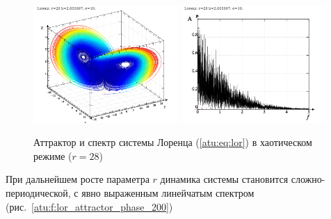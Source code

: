 \begin{figure}[h!]
\begin{center}
  \includegraphics[width=0.49\textwidth]{p/cha/lor/lor0-p_xyz_r=028.png}
  \hfill
  \includegraphics[width=0.49\textwidth]{p/cha/lor/lor0_fft-p_f_r=028.png}
\end{center}
  \caption{Аттрактор и спектр системы Лоренца (\ref{atu:eq:lor}) в хаотическом режиме ($r=28$)}
\label{atu:f:lor_attractor_phase_chaos28}
\end{figure}

При дальнейшем росте параметра $r$ динамика системы становится
сложно-периодической, с явно выраженным линейчатым спектром
(рис.~\ref{atu:f:lor_attractor_phase_200})

